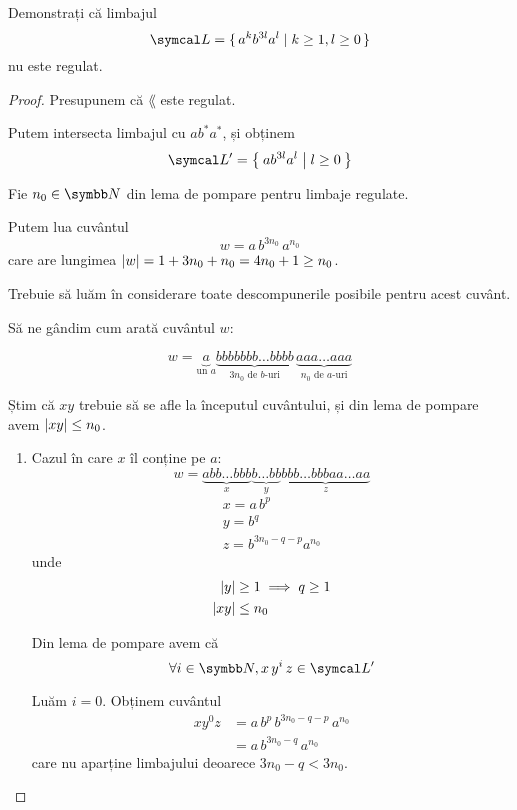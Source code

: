 \begin{exercise}
    Demonstrați că limbajul
    \[\lang = \set{ a^k b^{3l} a^l | k \geq 1, l \geq 0 }\]
    nu este regulat.
\end{exercise}
\begin{proof}
    Presupunem că \(\lang\) este regulat.

    Putem intersecta limbajul cu \(a b^* a^*\), și obținem
    \[\lang' = \Set{ a b^{3l} a^l | l \geq 0 }\]

    Fie \(n_0 \in \naturals\) din lema de pompare pentru limbaje regulate.

    Putem lua cuvântul
    \[w = a \, b^{3 n_0} \, a^{n_0}\]
    care are lungimea \(\left\lvert w\right\rvert = 1 + 3 n_0 + n_0 = 4 n_0 + 1 \geq n_0\).

    Trebuie să luăm în considerare toate descompunerile posibile pentru acest cuvânt.

    Să ne gândim cum arată cuvântul \(w\):

    \[w = \underbrace{a}_{\text{un \(a\)}} \underbrace{bbbbbbb\dots{}bbbb}_{3n_0 \text{ de \(b\)-uri}} \, \underbrace{aaa\dots{}aaa}_{n_0 \text{ de \(a\)-uri}}\]

    Știm că \(xy\) trebuie să se afle la începutul cuvântului, și din lema de pompare avem \(\left\lvert xy\right\rvert \leq n_0\).

    \begin{enumerate}
        \item Cazul în care \(x\) îl conține pe \(a\):
              \[w = \underbrace{a bb\dots{}bbb}_{x} \underbrace{b\dots{}bb}_{y} \underbrace{bbb\dots{}bbb aa\dots{}aa}_{z}\]
              \begin{gather*}
                  x = a \, b^p \\
                  y = b^q \\
                  z = b^{3 n_0 - q - p} a^{n_0}
              \end{gather*}
              unde
              \begin{align*}
                  \left\lvert y\right\rvert   & \geq 1 \implies q \geq 1 \\
                  \left\lvert x y\right\rvert & \leq n_0
              \end{align*}

              Din lema de pompare avem că
              \[\forall i \in \naturals, x \, y^i \, z \in \lang'\]

              Luăm \(i = 0\). Obținem cuvântul
              \begin{align*}
                  x y^0 z & = a \, b^p \, b^{3 n_0 - q - p} \, a^{n_0} \\
                          & = a \, b^{3 n_0 - q} \, a^{n_0}
              \end{align*}
              care nu aparține limbajului deoarece \(3 n_0 - q < 3 n_0\).


\end{enumerate}
\end{proof}
